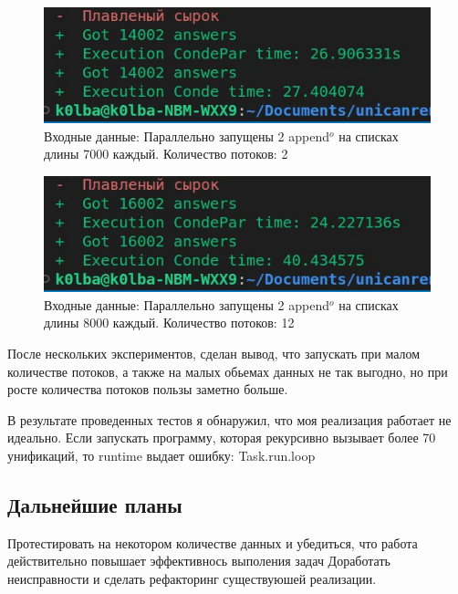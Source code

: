 \begin{figure}[h]

  \centering
  
  \includegraphics[width=0.8\linewidth]{1test.jpg}
  
  \caption{Входные данные: Параллельно запущены 2 append$^o$ на списках длины 7000 каждый.
  Количество потоков: 2}
  
  \label{fig:mpr}
  
\end{figure}
\begin{figure}[h]

  \centering
    
  \includegraphics[width=0.8\linewidth]{2test.jpg}
    
  \caption{Входные данные: Параллельно запущены 2 append$^o$ на списках длины 8000 каждый.
  Количество потоков: 12}
    
  \label{fig:mpr}
    
\end{figure}

После нескольких экспериментов, сделан вывод, что запускать при малом количестве потоков, а также на малых обьемах данных не так выгодно, но при росте количества потоков пользы заметно больше.

В результате проведенных тестов я обнаружил, что моя реализация работает не идеально. Если запускать программу, которая рекурсивно вызывает более 70 унификаций, то runtime выдает ошибку: Task.run.loop

\subsection{ \textbf{Дальнейшие планы}}

Протестировать на некотором количестве данных и убедиться, что
работа действительно повышает эффективнось выполения задач 
Доработать неисправности и сделать рефакторинг
существуюшей реализации.


